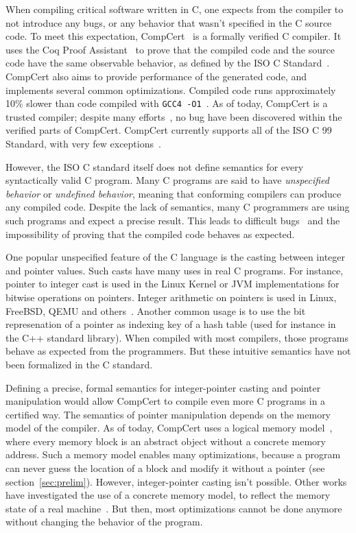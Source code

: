 When compiling critical software written in C, one expects from the compiler to not introduce any bugs, or any behavior that wasn't specified in the C source code.%
To meet this expectation, CompCert~\cite{DBLP:journals/cacm/Leroy09} is a formally verified C compiler.
It uses the Coq Proof Assistant~\cite{coq} to prove that the compiled code and the source code have the same observable behavior, as defined by the ISO C Standard~\cite{iso}.
CompCert also aims to provide performance of the generated code, and implements several common optimizations. Compiled code runs approximately 10\% slower than code compiled with \texttt{GCC4 -O1}~\cite{compcertwebsite}.
As of today, CompCert is a trusted compiler; despite many efforts~\cite{DBLP:conf/pldi/YangCER11}, no bug have been discovered within the verified parts of CompCert.
CompCert currently supports all of the ISO C 99 Standard, with very few exceptions~\cite{compcertwebsite}.

However, the ISO C standard itself does not define semantics for every syntactically valid C program.
Many C programs are said to have \textit{unspecified behavior} or \textit{undefined behavior}, meaning that conforming compilers can produce any compiled code.
Despite the lack of semantics, many C programmers are using such programs and expect a precise result. %
This leads to difficult bugs~\cite{DBLP:conf/apsys/WangCCJZK12} and the impossibility of proving that the compiled code behaves as expected.

One popular unspecified feature of the C language is the casting between integer and pointer values.
Such casts have many uses in real C programs. For instance, pointer to integer cast is used in the Linux Kernel or JVM implementations for bitwise operations on pointers. Integer arithmetic on pointers is used in Linux, FreeBSD, QEMU and others~\cite{cerberus}. Another common usage is to use the bit represenation of a pointer as indexing key of a hash table (used for instance in the C++ standard library).
When compiled with most compilers, those programs behave as expected from the programmers. But these intuitive semantics have not been formalized in the C standard.

Defining a precise, formal semantics for integer-pointer casting and pointer manipulation would allow CompCert to compile even more C programs in a certified way.
The semantics of pointer manipulation depends on the memory model of the compiler.
As of today, CompCert uses a logical memory model~\cite{leroy:hal-00703441}, where every memory block is an abstract object without a concrete memory address. Such a memory model enables many optimizations, because a program can never guess the location of a block and modify it without a pointer (see section~\ref{sec:prelim}).
However, integer-pointer casting isn't possible.
Other works have investigated the use of a concrete memory model, to reflect the memory state of a real machine~\cite{DBLP:conf/popl/TuchKN07}\cite{Norrish98cformalised}. But then, most optimizations cannot be done anymore without changing the behavior of the program.

